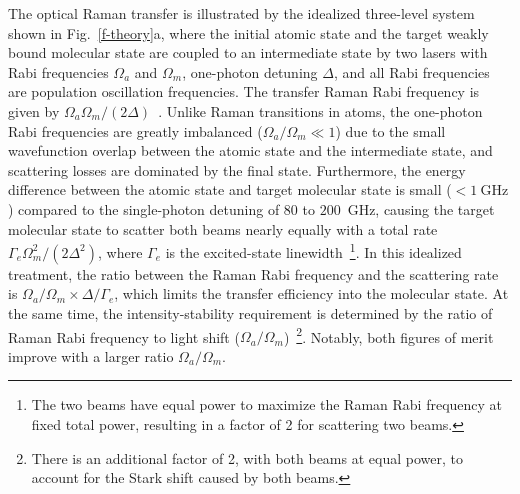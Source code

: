 \documentclass[aps,prl,twocolumn,10pt,superscriptaddress]{revtex4-1}
\begin{document}
The optical Raman transfer is illustrated
by the idealized three-level system shown in Fig.~\ref{f-theory}a,
where the initial atomic state and the target weakly bound molecular state are coupled to an intermediate state by two lasers with Rabi frequencies $\Omega_a$ and $\Omega_m$, one-photon detuning $ \Delta $, and all Rabi frequencies are population oscillation frequencies.  %
The transfer Raman Rabi frequency is given by $\Omega_a\Omega_m / (2\Delta)$~\cite{Wineland2003}.
Unlike Raman transitions in atoms, the one-photon Rabi frequencies are greatly imbalanced ($\Omega_a/\Omega_m \ll 1$) %
due to the small wavefunction overlap between the atomic state and the intermediate state, %
and scattering losses are dominated by the final state. Furthermore, the energy difference between the atomic state and target molecular state is small ($ < 1~\mathrm{GHz} $) compared to the single-photon detuning of $80$ to $200$~GHz, causing the target molecular state to scatter both beams nearly equally with a total rate $ \Gamma_e \Omega_m^2 / (2\Delta^2)$, where $ \Gamma_e $ is the excited-state linewidth~\footnote{The two beams have equal power to maximize the Raman Rabi frequency at fixed total power, resulting in a factor of 2 for scattering two beams.}.
In this idealized treatment, the ratio between the Raman Rabi frequency and the scattering rate is $ \Omega_a/\Omega_m \times \Delta/\Gamma_e $, which limits the transfer efficiency into the molecular state. At the same time, the intensity-stability requirement is determined by the ratio of Raman Rabi frequency to light shift ($\Omega_a/\Omega_m$)~\footnote{There is an additional factor of 2, with both beams at equal power,
  to account for the Stark shift caused by both beams.}. Notably, both figures of merit improve with a larger ratio $\Omega_a/\Omega_m$. %
\end{document}
